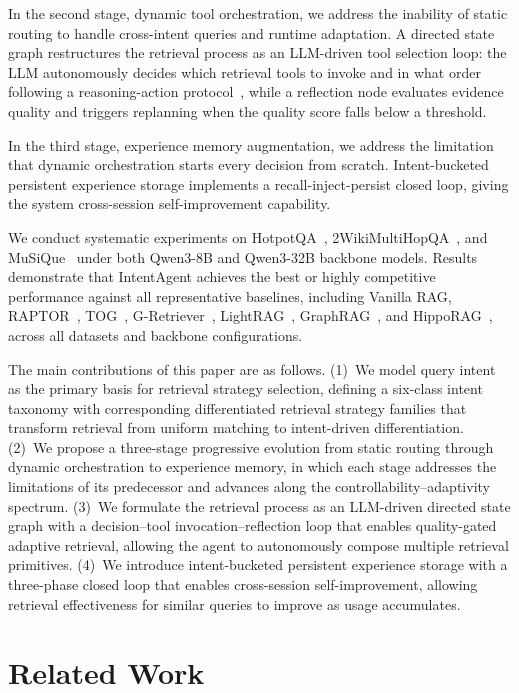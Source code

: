 \documentclass[runningheads]{llncs}
\begin{document}
In the second stage, dynamic tool orchestration, we address the inability of static routing to handle cross-intent queries and runtime adaptation. A directed state graph restructures the retrieval process as an LLM-driven tool selection loop: the LLM autonomously decides which retrieval tools to invoke and in what order following a reasoning-action protocol~\cite{ref13}, while a reflection node evaluates evidence quality and triggers replanning when the quality score falls below a threshold.

In the third stage, experience memory augmentation, we address the limitation that dynamic orchestration starts every decision from scratch. Intent-bucketed persistent experience storage implements a recall-inject-persist closed loop, giving the system cross-session self-improvement capability.

We conduct systematic experiments on HotpotQA~\cite{ref20}, 2WikiMultiHopQA~\cite{ref21}, and MuSiQue~\cite{ref22} under both Qwen3-8B and Qwen3-32B backbone models. Results demonstrate that IntentAgent achieves the best or highly competitive performance against all representative baselines, including Vanilla RAG, RAPTOR~\cite{ref23}, TOG~\cite{ref24}, G-Retriever~\cite{ref25}, LightRAG~\cite{ref26}, GraphRAG~\cite{ref27}, and HippoRAG~\cite{ref28}, across all datasets and backbone configurations.

The main contributions of this paper are as follows. (1)~We model query intent as the primary basis for retrieval strategy selection, defining a six-class intent taxonomy with corresponding differentiated retrieval strategy families that transform retrieval from uniform matching to intent-driven differentiation. (2)~We propose a three-stage progressive evolution from static routing through dynamic orchestration to experience memory, in which each stage addresses the limitations of its predecessor and advances along the controllability--adaptivity spectrum. (3)~We formulate the retrieval process as an LLM-driven directed state graph with a decision--tool invocation--reflection loop that enables quality-gated adaptive retrieval, allowing the agent to autonomously compose multiple retrieval primitives. (4)~We introduce intent-bucketed persistent experience storage with a three-phase closed loop that enables cross-session self-improvement, allowing retrieval effectiveness for similar queries to improve as usage accumulates.


\section{Related Work}
\end{document}
